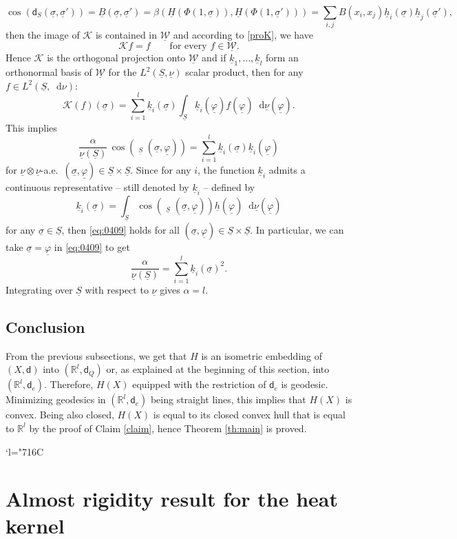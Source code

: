 \documentclass[JEP,XML,SOM,Unicode,published]{cedram}
\newcommand{\Changelback}{\mathcode`l="716C}
\theoremstyle{plain}
\theoremstyle{definition}
\newcommand{\setR}{\mathbb{R}}
\newcommand{\cW}{\underline{\mathcal{W}}}
\let\phi\varphi
\newcommand{\di}{\mathop{}\!\mathrm{d}}
\newcommand{\dist}{\mathsf{d}}
\newcommand{\uB}{\underline{B}}
\newcommand{\usigma}{\underline{\sigma}}
\DeclareMathOperator{\udist}{\underline{\dist}}
\newcommand{\uphi}{\underline{\phi}}
\newcommand{\uH}{\underline{H}}
\newcommand{\uS}{\underline{S}}
\newcommand{\unu}{\underline{\nu}}
\newcommand{\uh}{\underline{h}}
\begin{document}
\begin{equation}\label{expcos}\cos(\dist_S(\usigma,\usigma'))=\uB(\usigma,\usigma')=\beta\left(\uH(\Phi(1,\usigma)),\uH(\Phi(1,\usigma'))\right)=\sum_{i,j} B(x_i,x_j) \uh_i(\usigma)\uh_j(\usigma'),
\end{equation}
then the image of $\mathcal{K}$ is contained in $\cW$ and according to \eqref{proK}, we have
\[
\mathcal{K}f=f \qquad \text{for every $f \in \cW$.}
\]
Hence $\mathcal{K}$ is the orthogonal projection onto $\cW$ and
if $\underline{k}_1,\ldots, \underline{k}_l$ form an orthonormal basis of $\cW$ for the $L^2(\uS,\unu)$ scalar product, then for any $f\in L^2(\uS,\di\nu)$:
\[
\mathcal{K}(f)(\usigma)= \sum_{i=1}^l \underline{k}_i(\usigma) \int_{\uS} \underline{k}_i(\uphi) f(\uphi) \di \unu(\uphi).
\]
This implies
\begin{equation}\label{eq:0409}
\frac{\alpha}{\unu(\uS)}\, \cos(\udist_{\uS}(\usigma,\uphi)) = \sum_{i=1}^l \underline{k}_i(\usigma) \underline{k}_i(\uphi)
\end{equation}
for $\unu\otimes \unu$-a.e.\ $(\usigma,\uphi) \in \uS \times \uS$. Since for any $i$, the function $\underline{k}_i$ admits a continuous representative -- still denoted by $\underline{k}_i$ -- defined by
\[
\underline{k}_i (\usigma) = \int_{\uS} \cos(\udist_{\uS}(\usigma,\uphi)) \uh(\uphi) \di \unu(\uphi)
\]
for any $\usigma \in \uS$, then \eqref{eq:0409} holds for all $(\usigma,\uphi) \in \uS \times \uS$. In particular, we can take $\usigma = \uphi$ in \eqref{eq:0409} to get
\[
\frac{\alpha}{\unu(\uS)} = \sum_{i=1}^l \underline{k}_i(\usigma)^2.
\]
Integrating over $\uS$ with respect to $\unu$ gives $\alpha = l$.

\subsection{Conclusion}

From the previous subsections, we get that $H$ is an isometric embedding of $(X,\dist)$ into $(\setR^l,\dist_Q)$ or, as explained at the beginning of this section, into $(\setR^l,\dist_e)$. Therefore, $H(X)$ equipped with the restriction of $\dist_e$ is geodesic. Minimizing geodesics in $(\setR^l,\dist_e)$ being straight lines, this implies that $H(X)$ is convex. Being also closed, $H(X)$ is equal to its closed convex hull that is equal to $\setR^l$ by the proof of Claim \ref{claim}, hence Theorem \ref{th:main} is proved.

\Changelback
\section{Almost rigidity result for the heat kernel}\label{sec:5}
\end{document}
